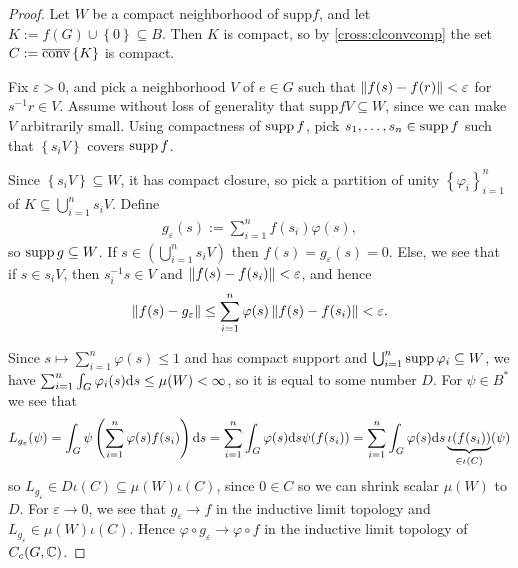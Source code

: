 \begin{proof}
	Let $W$ be a compact neighborhood of $\mathrm{supp} f$, and let $K:= f(G) \cup \left\{ 0 \right\} \subseteq B$. Then $K$ is compact, so by \ref{cross:clconvcomp} the set $C := \overline {\operatorname{conv}} \left\{ K \right\}$ is compact.

	Fix $\varepsilon > 0$, and pick a neighborhood $V$ of $e \in G$ such that $ \left\lVert f(s) - f(r) \right\rVert < \varepsilon$ for $s^{-1}r \in V$. Assume without loss of generality that $\mathrm{supp} f V \subseteq W$, since we can make $V$ arbitrarily small. Using compactness of $\operatorname{supp} f$, pick $s_1,\dots,s_n \in \operatorname{supp} f$ such that $\left\{ s_i V \right\}$ covers $\operatorname{supp} f$.
	
	Since $ \left\{ s_i V \right\} \subseteq W$, it has compact closure, so pick a partition of unity $\left\{ \varphi_i \right\}_{i=1}^n$ of $ K \subseteq \bigcup_{i=1}^n s_i V$. Define 
	\begin{align*}
		g_\varepsilon (s) := \sum_{i=1}^n f(s_i) \varphi(s),
	\end{align*}
	so $\operatorname{supp} g \subseteq W$. If $s \in \left( \bigcup_{i=1}^n s_i V \right)$ then $f(s) = g_{\varepsilon}(s) = 0$. Else, we see that if $s \in s_i V$, then $s_i^{-1}s \in V$ and $\left\lVert f(s) - f(s_i) \right\rVert < \varepsilon$, and hence
	\begin{align*}
		\left\lVert f(s) - g_{\varepsilon} \right\rVert  \leq \sum_{i=1}^n \varphi(s) \left\lVert f(s)-f(s_i) \right\rVert  < \varepsilon.
	\end{align*}

	Since $s \mapsto \sum_{i=1}^n \varphi(s) \leq 1$ and has compact support and $\bigcup_{i=1}^n \operatorname{supp} \varphi_i \subseteq W$, we have $\sum_{i=1}^n \int_G \varphi_i(s) \mathrm{d} s \leq \mu(W) < \infty$, so it is equal to some number $D$. For $\psi \in B^*$ we see that
	\begin{align*}
		L_{g_{\varepsilon}} ( \psi ) = \int_{G} \psi\left( \sum_{i=1}^n \varphi(s) f(s_i) \right) \mathrm{d} s = \sum_{i=1}^n \int_G \varphi(s) \mathrm{d} s \psi(f(s_i)) = \sum_{i=1}^n \int_G \varphi(s) \mathrm{d} s \underbrace{\iota(f(s_i))}_{ \in \iota(C)} (\psi) 
	\end{align*}
	so $L_{g_{\varepsilon}}  \in D \iota(C) \subseteq \mu(W) \iota(C)$, since $0 \in C$ so we can shrink scalar $\mu(W)$ to $D$. For $\varepsilon \to 0$, we see that $g_{\varepsilon} \to f$ in the inductive limit topology and $L_{g_\varepsilon} \in \mu(W) \iota(C)$. Hence $\varphi \circ g_\varepsilon \to \varphi \circ f$ in the inductive limit topology of $C_c(G, \mathbb{C})$. 

\end{proof}


